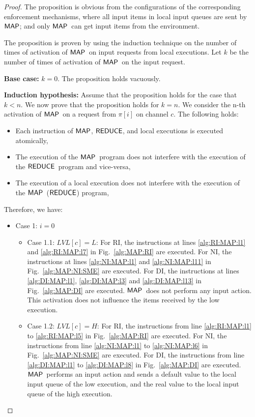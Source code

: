 \documentclass[10pt,a4paper,oneside]{article}
\def\LVL{\ensuremath{LVL}}
\def\chnl{\ensuremath{c}}
\def\sanserif#1{\ensuremath{\sf #1}}
\def\REDUCE{\ensuremath{\sanserif{REDUCE}}}
\def\MAP{\ensuremath{\sanserif{MAP}}}
\def\Prog{\ensuremath{\pi}}
\def\Progl#1{\ensuremath{\Prog[#1]}}
\begin{document}
\begin{proof}
The proposition is obvious from the configurations of the corresponding enforcement mechanisms, where all input items in local input queues are sent by \MAP; and only \MAP\ can get input items from the environment.

The proposition is proven by using the induction technique on the number of times of activation of \MAP\ on  input requests from local executions. Let $k$ be the number of times of activation of \MAP\ on the input request.

\textbf{Base case:} $k = 0$. The proposition holds vacuously.

\textbf{Induction hypothesis:} Assume that the proposition holds for the case that $k < n$. We now prove that the proposition holds for $k = n$. We consider the n-th activation of \MAP\ on a request from \Progl{i} on channel \chnl. The following holds:
\begin{itemize}
\item Each instruction of \MAP, \REDUCE, and local executions is executed atomically,
\item The execution of the \MAP\ program does not interfere with the execution of the \REDUCE\ program and vice-versa,
\item The execution of a local execution does not interfere with the execution of the \MAP\ (\REDUCE) program,
\end{itemize} Therefore, we have:


\begin{itemize}
\item Case 1: $i = 0$		
	\begin{itemize}
	\item Case 1.1: $\LVL[\chnl] = L$: For RI, the instructions at lines \ref{alg:RI:MAP:l1} and \ref{alg:RI:MAP:l7} in Fig.~\ref{alg:MAP:RI} are executed. For NI, the instructions at lines \ref{alg:NI:MAP:l1} and \ref{alg:NI:MAP:l11} in Fig.~\ref{alg:MAP:NI:SME} are executed. For DI, the instructions at lines \ref{alg:DI:MAP:l1}, \ref{alg:DI:MAP:l3} and \ref{alg:DI:MAP:l13} in Fig.~\ref{alg:MAP:DI} are executed. \MAP\ does not perform any input action. This activation does not influence the items received by the low execution.
	\item Case 1.2: $\LVL[\chnl] = H$: For RI, the instructions from line \ref{alg:RI:MAP:l1} to \ref{alg:RI:MAP:l5} in Fig.~\ref{alg:MAP:RI} are executed. For NI, the instructions from line \ref{alg:NI:MAP:l1} to \ref{alg:NI:MAP:l6} in Fig.~\ref{alg:MAP:NI:SME} are executed. For DI, the instructions from line \ref{alg:DI:MAP:l1} to \ref{alg:DI:MAP:l8} in Fig.~\ref{alg:MAP:DI} are executed. \MAP\ performs an input action and sends a default value to the local input queue of the low execution, and the real value to the local input queue of the high execution.
	\end{itemize}



\end{itemize}
\end{proof}
\end{document}
